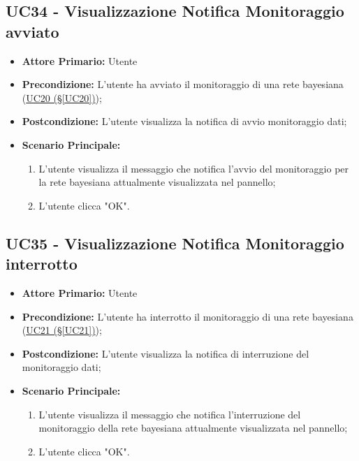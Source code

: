 \pagebreak

\subsection{UC34 - Visualizzazione Notifica Monitoraggio avviato}\label{UC34}

\begin{itemize}
	\item \textbf{Attore Primario:} Utente
	\item \textbf{Precondizione:} L'utente ha avviato il monitoraggio di una rete bayesiana (\hyperref[UC20]{UC20 (§\ref*{UC20})});
	\item \textbf{Postcondizione:} L'utente visualizza la notifica di avvio monitoraggio dati;
	\item \textbf{Scenario Principale:}
	\begin{enumerate}
		\item L'utente visualizza il messaggio che notifica l'avvio del monitoraggio per la rete bayesiana attualmente visualizzata nel pannello;
		\item L'utente clicca "OK".
	\end{enumerate}
\end{itemize}

\pagebreak

\subsection{UC35 - Visualizzazione Notifica Monitoraggio interrotto}\label{UC35}

\begin{itemize}
	\item \textbf{Attore Primario:} Utente
	\item \textbf{Precondizione:} L'utente ha interrotto il monitoraggio di una rete bayesiana (\hyperref[UC21]{UC21 (§\ref*{UC21})});
	\item \textbf{Postcondizione:} L'utente visualizza la notifica di interruzione del monitoraggio dati;
	\item \textbf{Scenario Principale:}
	\begin{enumerate}
		\item L'utente visualizza il messaggio che notifica l'interruzione del monitoraggio della rete bayesiana attualmente visualizzata nel pannello;
		\item L'utente clicca "OK".
	\end{enumerate}
\end{itemize}

